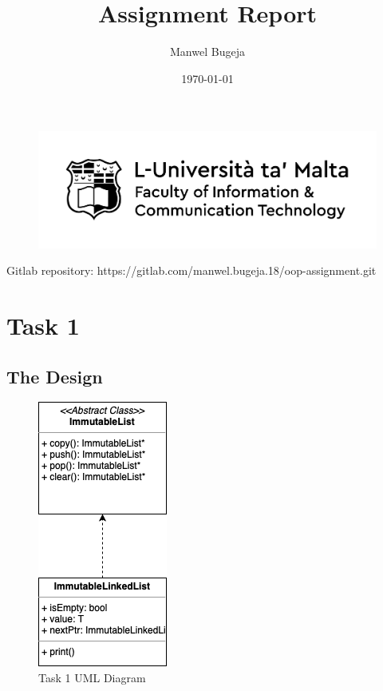 \documentclass[a4paper, 12pt]{report}
\begin{document}
\begin{figure}[H]
    \centering
    \includegraphics[width=1\textwidth]{Logo}
\end{figure}

\title{Assignment Report}
\author{Manwel Bugeja}
\date{\today}
\maketitle

\tableofcontents
\newpage

Gitlab repository: https://gitlab.com/manwel.bugeja.18/oop-assignment.git


\section{Task 1}

\subsection{The Design}

\begin{figure}[H]
    \centering
    \includegraphics{"UML 1"}
    \caption{Task 1 UML Diagram}
\end{figure}
\end{document}
